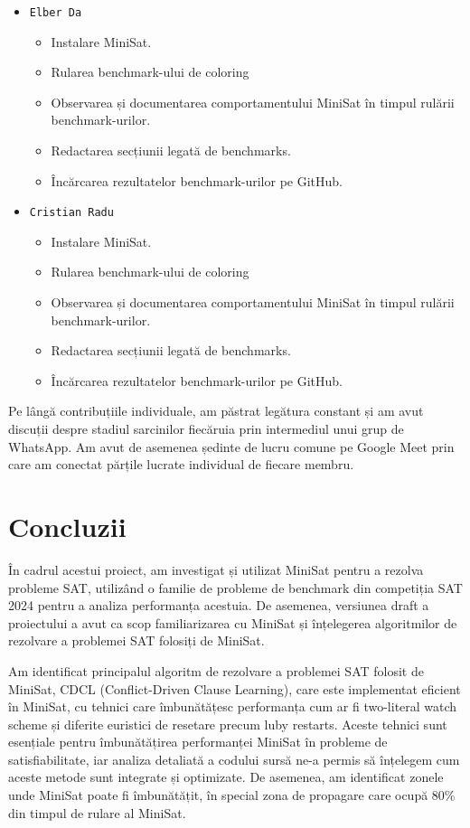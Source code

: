 \documentclass{llncs}
\begin{document}
\begin{itemize}
    \item \texttt{Elber Da}
    \begin{itemize}
        \item Instalare MiniSat.
        \item Rularea benchmark-ului de coloring
        \item Observarea și documentarea comportamentului MiniSat în timpul rulării benchmark-urilor.
        \item Redactarea secțiunii legată de benchmarks.
        \item Încărcarea rezultatelor benchmark-urilor pe GitHub.      
        \\
    \end{itemize}

    \item \texttt{Cristian Radu}
    \begin{itemize}
        \item Instalare MiniSat.
        \item Rularea benchmark-ului de coloring
        \item Observarea și documentarea comportamentului MiniSat în timpul rulării benchmark-urilor.
        \item Redactarea secțiunii legată de benchmarks.
        \item Încărcarea rezultatelor benchmark-urilor pe GitHub.
    \end{itemize}
\end{itemize}

    Pe lângă contribuțiile individuale, am păstrat legătura constant și am avut discuții despre stadiul sarcinilor fiecăruia prin intermediul unui grup de WhatsApp. Am avut de asemenea ședinte de lucru comune pe Google Meet prin care am conectat părțile lucrate individual de fiecare membru.

\section{Concluzii}

În cadrul acestui proiect, am investigat și utilizat MiniSat pentru a rezolva probleme SAT, utilizând o familie de probleme de benchmark din competiția SAT 2024\cite{ref_SAT_Competition_home_page} pentru a analiza performanța acestuia. De asemenea, versiunea draft a proiectului a avut ca scop familiarizarea cu MiniSat și înțelegerea algoritmilor de rezolvare a problemei SAT folosiți de MiniSat.

Am identificat principalul algoritm de rezolvare a problemei SAT folosit de MiniSat, CDCL (Conflict-Driven Clause Learning), care este implementat eficient în MiniSat, cu tehnici care îmbunătățesc performanța cum ar fi two-literal watch scheme și diferite euristici de resetare precum luby restarts. Aceste tehnici sunt esențiale pentru îmbunătățirea performanței MiniSat în probleme de satisfiabilitate, iar analiza detaliată a codului sursă ne-a permis să înțelegem cum aceste metode sunt integrate și optimizate. De asemenea, am identificat zonele unde MiniSat poate fi îmbunătățit, în special zona de propagare care ocupă 80\% din timpul de rulare al MiniSat\cite{ref_MiniSat_Extensible_SAT_Paper}.
\end{document}
